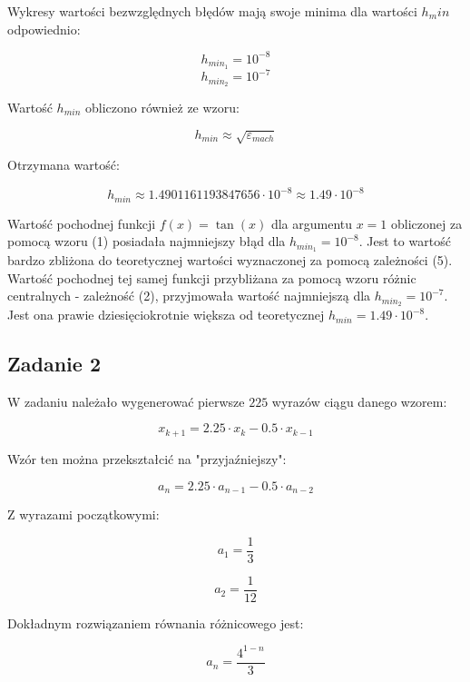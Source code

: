 \documentclass{article}
\begin{document}
	Wykresy wartości bezwzględnych błędów mają swoje minima dla wartości $h_min$ odpowiednio:
	
	$$h_{min_1} = 10^{-8}$$
	$$h_{min_2} = 10^{-7}$$
	
	Wartość $h_{min}$ obliczono również ze wzoru:
	
	\begin{equation}
		h_{min} \approx \sqrt{\varepsilon_{mach}}
	\end{equation}
	
	Otrzymana wartość:
	
	$$h_{min} \approx 1.4901161193847656 \cdot 10^{-8} \approx 1.49 \cdot 10^{-8}$$
	
	Wartość pochodnej funkcji $f(x) = \tan (x)$ dla argumentu $x = 1$ obliczonej za pomocą wzoru (1) posiadała najmniejszy błąd dla $h_{min_1} = 10^{-8}$. Jest to wartość bardzo zbliżona do teoretycznej wartości wyznaczonej za pomocą zależności (5). \newline \newline
	Wartość pochodnej tej samej funkcji przybliżana za pomocą wzoru różnic centralnych - zależność (2), przyjmowała wartość najmniejszą dla $h_{min_2} = 10^{-7}$. Jest ona prawie dziesięciokrotnie większa od teoretycznej $h_{min} = 1.49 \cdot 10^{-8}$. 
	
	\newline
	
	
	\subsection*{Zadanie 2}
	
	W zadaniu należało wygenerować pierwsze $225$ wyrazów ciągu danego wzorem:
	
	\begin{equation}
		x_{k+1} = 2.25 \cdot x_k - 0.5 \cdot x_{k-1}	
	\end{equation}
	
	Wzór ten można przekształcić na "przyjaźniejszy":
	
	\begin{equation}
		a_n = 2.25 \cdot a_{n-1} - 0.5 \cdot a_{n-2}
	\end{equation}
	
	Z wyrazami początkowymi:
	
	$$a_1 = \frac{1}{3}$$
	
	$$a_2 = \frac{1}{12}$$
	
	Dokładnym rozwiązaniem równania różnicowego jest:
	
	\begin{equation}
		a_n = \frac{4^{1-n}}{3}
	\end{equation}
	
\end{document}
